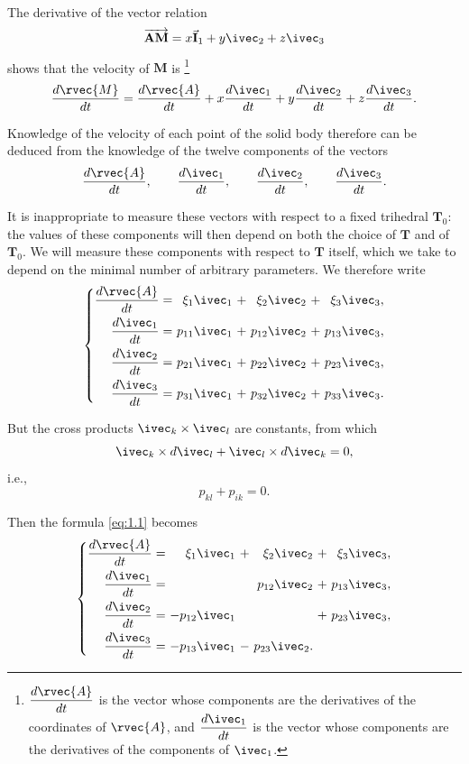 The derivative of the vector relation
\[
\overrightarrow{\mathbf{AM}}=x\vec{ \mathbf{I}}_{1}+y\ivec_{2}+z \ivec_{3}
\]
shows that the velocity of $\mathbf{M}$ is \footnote{$\dfrac{d{\rvec{A}}}{dt}$ is the vector whose components are the derivatives of the coordinates of ${\rvec{A}}$, and $\dfrac{d\ivec_{1}}{dt}$ is the vector whose components are the derivatives of the components of $\ivec_{1}$.}
\[
\frac{d{\rvec{M}}}{dt}=\frac{d{\rvec{A}}}{dt}+x\frac{d \ivec_{1}}{dt}+y\frac{d\ivec_{2}}{dt}+z\frac{d\ivec_{3}}{dt}.
\]

Knowledge of the velocity of each point of the solid body therefore can be deduced from the knowledge of the twelve components of the vectors
\[
\frac{d{\rvec{A}}}{dt},\qquad\frac{d\ivec_{1}}{dt},\qquad\frac{d\ivec_{2}}{dt},\qquad\frac{d\ivec_{3}}{dt}.
\]

It is inappropriate to measure these vectors with respect to a fixed trihedral $\mathbf{T}_{0}$: the values of these components will then depend on both the choice of $\mathbf{T}$ and of $\mathbf{T}_{0}$. We will measure these components with respect to $\mathbf{T}$ itself, which we take to depend on the minimal number of arbitrary parameters. We therefore write
\begin{equation}
  \label{eq:1.1}
  \left\{
    \begin{alignedat}{6}
      \frac{d{\rvec{A}}}{dt}&=&\xi_{1}\ivec_{1}&\ +\ &\xi_{2}\ivec_{2}&\ +\ &\xi_{3}\ivec_{3},\\
      \frac{d\ivec_{1}}{dt}&=&\ p_{11}\ivec_{1}&\ +\ &p_{12}\ivec_{2}&\ +\ &p_{13}\ivec_{3},\\
      \frac{d\ivec_{2}}{dt}&=&\ p_{21}\ivec_{1}&\ +\ &p_{22}\ivec_{2}&\ +\ &p_{23}\ivec_{3},\\
      \frac{d\ivec_{3}}{dt}&=&\ p_{31}\ivec_{1}&\ +\ &p_{32}\ivec_{2}&\ +\ &p_{33}\ivec_{3}.\\
    \end{alignedat}
  \right.
\end{equation}

But the cross products $\ivec_{k}\times\ivec_{l}$ are constants, from which
\[
\ivec_{k}\times d\ivec_{l}+\ivec_{l}\times d\ivec_{k}=0,
\]
i.e.,
\[
p_{kl}+p_{ik}=0.
\]

Then the formula \eqref{eq:1.1} becomes
\begin{equation}
  \label{eq:1.2}
  \left\{
    \begin{alignedat}{6}
      \frac{d{\rvec{A}}}{dt}&=&\xi_{1}\ivec_{1}&\ +\ &\xi_{2}\ivec_{2}&\ +\ &\xi_{3}\ivec_{3},\\
      \frac{d\ivec_{1}}{dt}&=&&&p_{12}\ivec_{2}&\ +\ &p_{13}\ivec_{3},\\
      \frac{d\ivec_{2}}{dt}&=&\ -p_{12}\ivec_{1}& &&\ +\ &p_{23}\ivec_{3},\\
      \frac{d\ivec_{3}}{dt}&=&\ -p_{13}\ivec_{1}&\ -\ &p_{23}\ivec_{2}.\\
    \end{alignedat}
  \right.
\end{equation}

